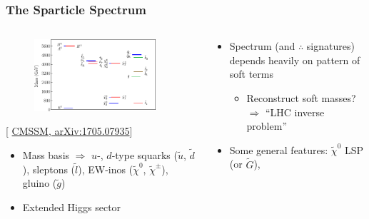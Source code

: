 \documentclass[10pt,aspectratio=169]{beamer}
\begin{document}
\begin{frame}
  \frametitle{The Sparticle Spectrum}
  \begin{columns}[t]
    \begin{column}{0.5\textwidth}
      \begin{figure}
        \centering
        \includegraphics[width=0.9\textwidth]{gambit_cmssm_best_fit}
      \end{figure}
      \vspace*{-25pt}
      \begin{center}
        { \tiny [ \href{http://arxiv.org/abs/1705.07935}{%
              CMSSM, arXiv:1705.07935}] }
      \end{center}
      \begin{itemize}\itemsep1em
      \item Mass basis $\Rightarrow$ $u$-, $d$-type squarks ($\tilde{u}$,
        $\tilde{d}$), sleptons ($\tilde{l}$), EW-inos ($\tilde{\chi}^0$,
        $\tilde{\chi}^\pm$), gluino ($\tilde{g}$)
      \item {\color{blue} Extended Higgs sector}
      \end{itemize}
    \end{column}
    \begin{column}{0.5\textwidth}
      \vspace*{-15pt}
      \begin{itemize}\itemsep1em
      \item \alert{Spectrum (and $\therefore$ signatures) depends heavily
        on pattern of soft terms}
        \begin{itemize}
        \item Reconstruct soft masses? $\Rightarrow$ ``LHC inverse
          problem''
        \end{itemize}
      \item Some general features: $\tilde{\chi}^0$ LSP (or $\tilde{G}$),

\end{itemize}
\end{column}
\end{columns}
\end{frame}
\end{document}
